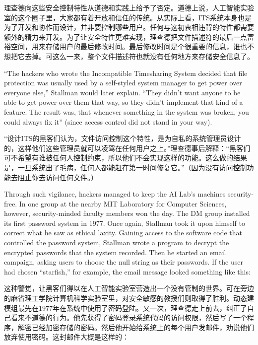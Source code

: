 \ifdefined\chs
理查德向这些安全控制特性从道德和实践上给予了否定。道德上说，人工智能实验室的这个圈子里，大家都有着开放和信任的传统。从实际上看，ITS系统本身也是为了开发和协作而设计，并非要控制哪些用户。任何与这初衷相违背的特性都需要额外的精力来开发。为了让安全特性更难实现，理查德把文件描述符的最后一点富裕空间，用来存储用户的最后修改时间。最后修改时间是个很重要的信息，谁也不想把它去掉。可这么一来，整个文件描述符也就没有任何地方来存储安全信息了。
\fi

\ifdefined\eng
``The hackers who wrote the Incompatible Timesharing System decided that file protection was usually used by a self-styled system manager to get power over everyone else,'' Stallman would later explain. ``They didn't want anyone to be able to get power over them that way, so they didn't implement that kind of a feature. The result was, that whenever something in the system was broken, you could always fix it'' (since access control did not stand in your way).
\fi

\ifdefined\chs
“设计ITS的黑客们认为，文件访问控制这个特性，是为自私的系统管理员设计的，这样他们这些管理员就可以凌驾在任何用户之上。”理查德事后解释：“黑客们可不希望有谁被任何人控制约束，所以他们不会实现这样的功能。这么做的结果是，一旦系统出了毛病，任何人都能赶在第一时间修复它。”（因为没有访问控制功能去阻止你去访问任何文件。）
\fi

\ifdefined\eng
Through such vigilance, hackers managed to keep the AI Lab's machines security-free. In one group at the nearby MIT Laboratory for Computer Sciences, however, security-minded faculty members won the day. The DM group installed its first password system in 1977. Once again, Stallman took it upon himself to correct what he saw as ethical laxity. Gaining access to the software code that controlled the password system, Stallman wrote a program to decrypt the encrypted passwords that the system recorded.  Then he started an email campaign, asking users to choose the null string as their passwords. If the user had chosen ``starfish,'' for example, the email message looked something like this:
\fi

\ifdefined\chs
这种警觉，让黑客们得以在人工智能实验室营造出一个没有管制的世界。可在旁边的麻省理工学院计算机科学实验室里，对安全敏感的教授们则取得了胜利。动态建模组最先在1977年在系统中使用了密码登陆。又一次，理查德走上前去，纠正了自己看来不道德的行为。他先获得了密码登录系统代码的访问权限，然后写了一个程序，解密已经加密存储的密码。然后他开始给系统上的每个用户发邮件，劝说他们放弃使用密码。这封邮件大概是这样的：
\fi

